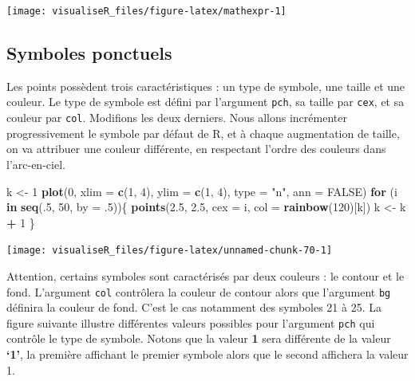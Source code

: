 \documentclass[]{article}
\newenvironment{Shaded}{\begin{snugshade}}{\end{snugshade}}
\newcommand{\ControlFlowTok}[1]{\textcolor[rgb]{0.13,0.29,0.53}{\textbf{#1}}}
\newcommand{\DataTypeTok}[1]{\textcolor[rgb]{0.13,0.29,0.53}{#1}}
\newcommand{\DecValTok}[1]{\textcolor[rgb]{0.00,0.00,0.81}{#1}}
\newcommand{\FloatTok}[1]{\textcolor[rgb]{0.00,0.00,0.81}{#1}}
\newcommand{\KeywordTok}[1]{\textcolor[rgb]{0.13,0.29,0.53}{\textbf{#1}}}
\newcommand{\NormalTok}[1]{#1}
\newcommand{\OperatorTok}[1]{\textcolor[rgb]{0.81,0.36,0.00}{\textbf{#1}}}
\newcommand{\OtherTok}[1]{\textcolor[rgb]{0.56,0.35,0.01}{#1}}
\newcommand{\StringTok}[1]{\textcolor[rgb]{0.31,0.60,0.02}{#1}}
\begin{document}
\begin{center}\texttt{[image: visualiseR\_files/figure-latex/mathexpr-1]} \end{center}

\hypertarget{symboles-ponctuels}{%
\subsection{Symboles ponctuels}\label{symboles-ponctuels}}

Les points possèdent trois caractéristiques : un type de symbole, une taille et
une couleur. Le type de symbole est défini par l'argument \texttt{pch}, sa taille par
\texttt{cex}, et sa couleur par \texttt{col}. Modifions les deux derniers. Nous allons
incrémenter progressivement le symbole par défaut de R, et à chaque augmentation
de taille, on va attribuer une couleur différente, en respectant l'ordre des
couleurs dans l'arc-en-ciel.

\begin{Shaded}
\begin{Highlighting}[]
\NormalTok{k <-}\StringTok{ }\DecValTok{1}
\KeywordTok{plot}\NormalTok{(}\DecValTok{0}\NormalTok{, }\DataTypeTok{xlim =} \KeywordTok{c}\NormalTok{(}\DecValTok{1}\NormalTok{, }\DecValTok{4}\NormalTok{), }\DataTypeTok{ylim =} \KeywordTok{c}\NormalTok{(}\DecValTok{1}\NormalTok{, }\DecValTok{4}\NormalTok{), }\DataTypeTok{type =} \StringTok{"n"}\NormalTok{, }\DataTypeTok{ann =} \OtherTok{FALSE}\NormalTok{)}
\ControlFlowTok{for}\NormalTok{ (i }\ControlFlowTok{in} \KeywordTok{seq}\NormalTok{(.}\DecValTok{5}\NormalTok{, }\DecValTok{50}\NormalTok{, }\DataTypeTok{by =} \FloatTok{.5}\NormalTok{))\{}
\KeywordTok{points}\NormalTok{(}\FloatTok{2.5}\NormalTok{, }\FloatTok{2.5}\NormalTok{, }\DataTypeTok{cex =}\NormalTok{ i, }\DataTypeTok{col =} \KeywordTok{rainbow}\NormalTok{(}\DecValTok{120}\NormalTok{)[k])}
\NormalTok{k <-}\StringTok{ }\NormalTok{k }\OperatorTok{+}\StringTok{ }\DecValTok{1}
\NormalTok{\}}
\end{Highlighting}
\end{Shaded}

\begin{center}\texttt{[image: visualiseR\_files/figure-latex/unnamed-chunk-70-1]} \end{center}

Attention, certains symboles sont caractérisés par deux couleurs : le contour et
le fond. L'argument \texttt{col} contrôlera la couleur de contour alors que l'argument
\texttt{bg} définira la couleur de fond. C'est le cas notamment des symboles 21 à 25.
La figure suivante illustre différentes valeurs possibles pour l'argument \texttt{pch}
qui contrôle le type de symbole. Notons que la valeur \textbf{1} sera différente de
la valeur \textbf{`1'}, la première affichant le premier symbole alors que le second
affichera la valeur 1.
\end{document}
